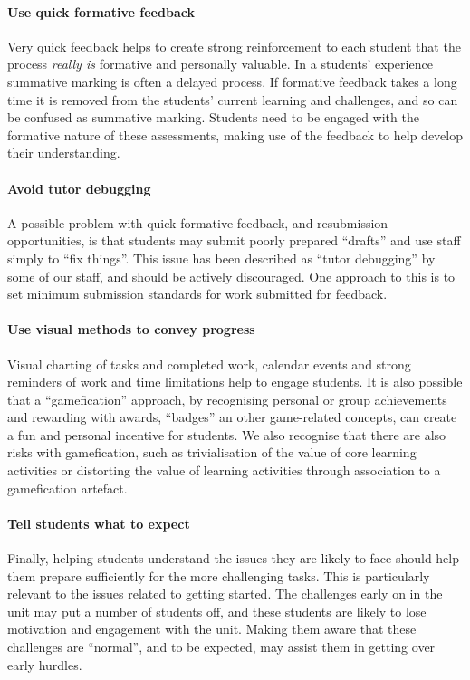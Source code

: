 \paragraph{Use quick formative feedback}

Very quick feedback helps to create strong reinforcement to each student that the process \emph{really is} formative and personally valuable. In a students' experience summative marking is often a delayed process. If formative feedback takes a long time it is removed from the students' current learning and challenges, and so can be confused as summative marking. Students need to be engaged with the formative nature of these assessments, making use of the feedback to help develop their understanding.

\paragraph{Avoid tutor debugging}

A possible problem with quick formative feedback, and resubmission opportunities, is that students may submit poorly prepared ``drafts'' and use staff simply to ``fix things''. This issue has been described as ``tutor debugging'' by some of our staff, and should be actively discouraged. One approach to this is to set minimum submission standards for work submitted for feedback. 

\paragraph{Use visual methods to convey progress }

Visual charting of tasks and completed work, calendar events and strong reminders of work and time limitations help to engage students. It is also possible that a ``gamefication'' approach, by recognising personal or group achievements and rewarding with awards, ``badges'' an other game-related concepts, can create a fun and personal incentive for students. We also recognise that there are also risks with gamefication, such as trivialisation of the value of core learning activities or distorting the value of learning activities through association to a gamefication artefact.

\paragraph{Tell students what to expect}
Finally, helping students understand the issues they are likely to face should help them prepare sufficiently for the more challenging tasks. This is particularly relevant to the issues related to getting started. The challenges early on in the unit may put a number of students off, and these students are likely to lose motivation and engagement with the unit. Making them aware that these challenges are ``normal'', and to be expected, may assist them in getting over early hurdles.

